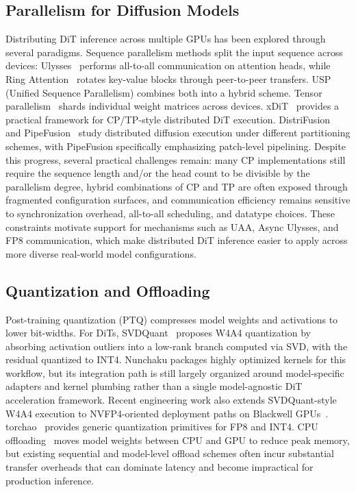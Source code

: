\documentclass[10pt]{article}
\begin{document}
\subsection{Parallelism for Diffusion Models}

Distributing DiT inference across multiple GPUs has been explored through several paradigms. Sequence parallelism methods split the input sequence across devices: Ulysses~\cite{jacobs2023ulysses} performs all-to-all communication on attention heads, while Ring Attention~\cite{liu2023ring} rotates key-value blocks through peer-to-peer transfers. USP (Unified Sequence Parallelism) combines both into a hybrid scheme. Tensor parallelism~\cite{narayanan2021megatron} shards individual weight matrices across devices. xDiT~\cite{fang2024xdit} provides a practical framework for CP/TP-style distributed DiT execution. DistriFusion~\cite{li2024distrifusion} and PipeFusion~\cite{wang2024pipefusion} study distributed diffusion execution under different partitioning schemes, with PipeFusion specifically emphasizing patch-level pipelining. Despite this progress, several practical challenges remain: many CP implementations still require the sequence length and/or the head count to be divisible by the parallelism degree, hybrid combinations of CP and TP are often exposed through fragmented configuration surfaces, and communication efficiency remains sensitive to synchronization overhead, all-to-all scheduling, and datatype choices. These constraints motivate support for mechanisms such as UAA, Async Ulysses, and FP8 communication, which make distributed DiT inference easier to apply across more diverse real-world model configurations.

\subsection{Quantization and Offloading}

Post-training quantization (PTQ) compresses model weights and activations to lower bit-widths. For DiTs, SVDQuant~\cite{li2025svdquant} proposes W4A4 quantization by absorbing activation outliers into a low-rank branch computed via SVD, with the residual quantized to INT4. Nunchaku packages highly optimized kernels for this workflow, but its integration path is still largely organized around model-specific adapters and kernel plumbing rather than a single model-agnostic DiT acceleration framework. Recent engineering work also extends SVDQuant-style W4A4 execution to NVFP4-oriented deployment paths on Blackwell GPUs~\cite{hanlab2025nvfp4}. torchao~\cite{torchao2024} provides generic quantization primitives for FP8 and INT4. CPU offloading~\cite{diffusers2024} moves model weights between CPU and GPU to reduce peak memory, but existing sequential and model-level offload schemes often incur substantial transfer overheads that can dominate latency and become impractical for production inference.
\end{document}
